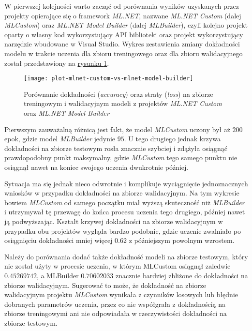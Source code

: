 W pierwszej kolejności warto zacząć od porównania wyników uzyskanych przez projekty opierające się o framework \emph{ML.NET}, nazwane \emph{ML.NET Custom} (dalej \emph{MLCustom}) oraz \emph{ML.NET Model Builder} (dalej \emph{MLBuilder}), czyli kolejno projekt oparty o własny kod wykorzystujący API biblioteki oraz projekt wykorzystujący narzędzie wbudowane w Visual Studio.
Wykres zestawienia zmiany dokładności modelu w trakcie uczenia dla zbioru treningowego oraz dla zbioru walidacyjnego został przedstawiony na \hyperref[fig:plot-mlnet-custom-vs-mlnet-model-builder]{rysunku \ref*{fig:plot-mlnet-custom-vs-mlnet-model-builder}}.

\begin{figure}[ht]
  \texttt{[image: plot-mlnet-custom-vs-mlnet-model-builder]}
  \caption[Porównanie dokładności oraz straty modeli ML.NET Custom oraz ML.NET Model Builder]{Porównanie dokładności (\emph{accuracy}) oraz straty (\emph{loss}) na zbiorze treningowym i walidacyjnym modeli z projektów \emph{ML.NET Custom} oraz \emph{ML.NET Model Builder}}
  \label{fig:plot-mlnet-custom-vs-mlnet-model-builder}
\end{figure}

Pierwszym zauważalną różnicą jest fakt, że model \emph{MLCustom} uczony był aż $200$ epok, gdzie model \emph{MLBuilder} jedynie $95$.
U tego drugiego jednak krzywa dokładności na zbiorze testowym rosła znacznie szybciej i zdążyła osiągnąć prawdopodobny punkt maksymalny, gdzie \emph{MLCustom} tego samego punktu nie osiągnął nawet na koniec swojego uczenia dwukrotnie później.

Sytuacja ma się jednak nieco odwrotnie i komplikuje wyciągnięcie jednoznacznych wniosków w przypadku dokładności na zbiorze walidacyjnym.
Na tym wykresie bowiem \emph{MLCustom} od samego początku miał wyższą skuteczność niż \emph{MLBuilder} i utrzymywał tę przewagę do końca procesu uczenia tego drugiego, później nawet ją podwyższając.
Kształt krzywej dokładności na zbiorze walidacyjnym w przypadku obu projektów wygląda bardzo podobnie, gdzie uczenie zwalniało po osiągnięciu dokładności mniej więcej $0.62$ z późniejszym powolnym wzrostem.

Należy do porównania dodać także dokładność modeli na zbiorze testowym, który nie został użyty w procesie uczenia, w którym MLCustom osiągnął zaledwie $0.45269742$, a MLBuilder $0.70602033$ znacznie bardziej zbliżone do dokładności na zbiorze walidacyjnym.
Sugerować to może, że dokładność na zbiorze walidacyjnym projektu \emph{MLCustom} wynikała z czynników losowych lub błędnie dobranych parametrów uczenia, przez co nie współgrała z dokładnością na zbiorze treningowymi ani nie odpowiadała w rzeczywistości dokładności na zbiorze testowym.

